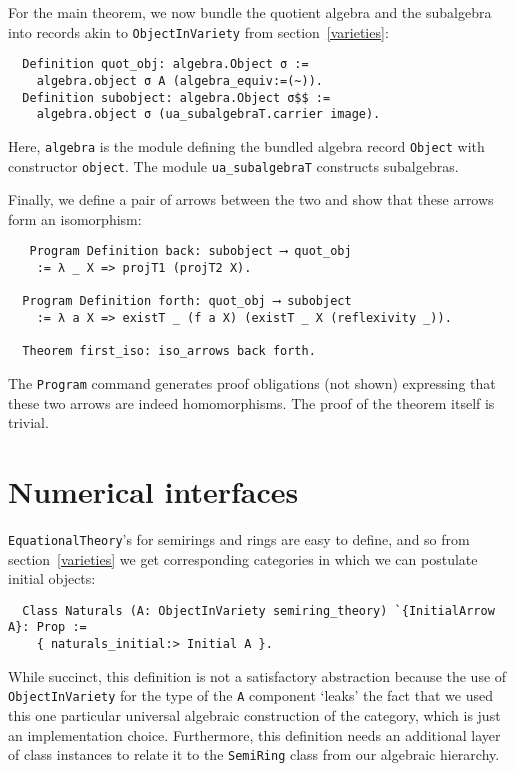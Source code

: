 \documentclass[a4paper,10pt,runningheads]{llncs}
\begin{document}
For the main theorem, we now bundle the quotient algebra and the subalgebra into records akin to \lstinline|ObjectInVariety| from section~\ref{varieties}:
\begin{lstlisting}
  Definition quot_obj: algebra.Object σ :=
    algebra.object σ A (algebra_equiv:=(~)).
  Definition subobject: algebra.Object σ$$ :=
    algebra.object σ (ua_subalgebraT.carrier image).
\end{lstlisting}
Here, \lstinline|algebra| is the module defining the bundled algebra record \lstinline|Object| with constructor \lstinline|object|. The module \lstinline|ua_subalgebraT| constructs subalgebras.

Finally, we define a pair of arrows between the two and show that these arrows form an isomorphism:
\begin{lstlisting}
   Program Definition back: subobject ⟶ quot_obj
    := λ _ X => projT1 (projT2 X).

  Program Definition forth: quot_obj ⟶ subobject
    := λ a X => existT _ (f a X) (existT _ X (reflexivity _)).

  Theorem first_iso: iso_arrows back forth.
\end{lstlisting}
The \lstinline|Program| command generates proof obligations (not shown) expressing that these two arrows are indeed homomorphisms. The proof of the theorem itself is trivial.


\section{Numerical interfaces}\label{numbers}

\lstinline|EquationalTheory|'s for semirings and rings are easy to define, and so from section~\ref{varieties} we get corresponding categories in which we can postulate initial objects:
\begin{lstlisting}
  Class Naturals (A: ObjectInVariety semiring_theory) `{InitialArrow A}: Prop :=
    { naturals_initial:> Initial A }.
\end{lstlisting}
While succinct, this definition is not a satisfactory abstraction because the use of \lstinline|ObjectInVariety| for the type of the \lstinline|A| component `leaks' the fact that we used this one particular universal algebraic construction of the category, which is just an implementation choice. Furthermore, this definition needs an additional layer of class instances to relate it to the \lstinline|SemiRing| class from our algebraic hierarchy.
\end{document}
